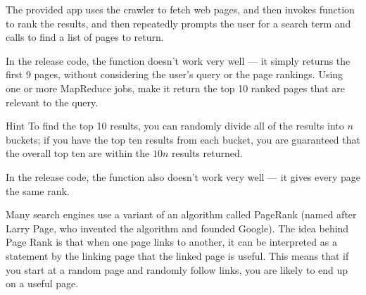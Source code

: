 \documentclass{pset}
\begin{document}
The provided  app uses the crawler to fetch web pages, and then
invokes  function to rank the results,
and then repeatedly prompts the user for a search term and calls
 to find a list of pages to return.

In the release code, the  function doesn't work very well
--- it simply returns the first 9 pages, without considering the user's query
or the page rankings.  Using one or more MapReduce jobs, make it return the top
10 ranked pages that are relevant to the query.

\begin{note}{Hint} To find the top 10 results, you can randomly divide all of
the results into $n$ buckets; if you have the top ten results from each bucket,
you are guaranteed that the overall top ten are within the $10n$ results
returned.
\end{note}




In the release code, the  function also doesn't work
very well --- it gives every page the same rank.

Many search engines use a variant of an algorithm called PageRank (named after
Larry Page, who invented the algorithm and founded Google).  The idea behind
Page Rank is that when one page links to another, it can be interpreted as a
statement by the linking page that the linked page is useful.  This means that
if you start at a random page and randomly follow links, you are likely to end
up on a useful page.
\end{document}
